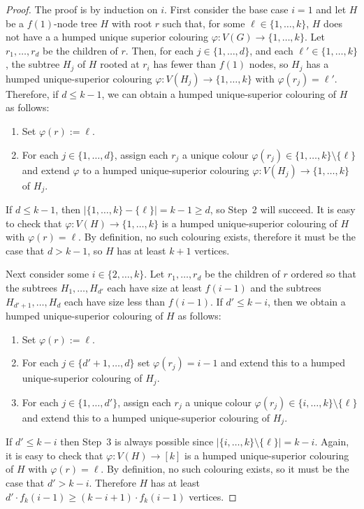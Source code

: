 \documentclass[kpfonts]{patmorin}
\begin{document}
\begin{proof}
    The proof is by induction on $i$. First consider the base case $i=1$ and let $H$ be a $f(1)$-node tree $H$ with root $r$ such that, for some $\ell\in\{1,\ldots,k\}$, $H$ does not have a a humped unique superior colouring $\varphi:V(G)\to \{1,\ldots,k\}$.  Let $r_1,\ldots,r_d$ be the children of $r$.
    Then, for each $j\in\{1,\ldots,d\}$, and each $\ell'\in \{1,\ldots,k\}$, the subtree $H_j$ of $H$ rooted at $r_i$ has fewer than $f(1)$ nodes, so $H_j$ has a humped unique-superior colouring $\varphi:V(H_j)\to \{1,\ldots,k\}$ with $\varphi(r_j)=\ell'$.  Therefore, if $d \le k-1$, we can obtain a humped unique-superior colouring of $H$ as follows:
    \begin{enumerate}
        \item Set $\varphi(r):=\ell$.
        \item For each $j\in\{1,\ldots,d\}$, assign each $r_j$ a unique colour  $\varphi(r_j)\in\{1,\ldots,k\}\setminus\{\ell\}$ and extend $\varphi$ to a humped unique-superior colouring $\varphi:V(H_j)\to\{1,\ldots,k\}$ of $H_j$.
    \end{enumerate}
    If $d\le k-1$, then $|\{1,\ldots,k\}-\{\ell\}|=k-1\ge d$, so Step~2 will succeed.
    It is easy to check that $\varphi:V(H)\to\{1,\ldots,k\}$ is a humped unique-superior colouring of $H$ with $\varphi(r)=\ell$.  By definition, no such colouring exists, therefore it must be the case that $d> k-1$, so $H$ has at least $k+1$ vertices.

    Next consider some $i\in\{2,\ldots,k\}$.  Let $r_1,\ldots,r_d$ be the children of $r$ ordered so that the subtrees $H_1,\ldots,H_{d'}$ each have size at least $f(i-1)$ and the subtrees $H_{d'+1},\ldots,H_d$ each have size less than $f(i-1)$.  If $d'\le k-i$, then we obtain a humped unique-superior colouring of $H$ as follows:
    \begin{enumerate}
        \item Set $\varphi(r):=\ell$.
        \item For each $j\in\{d'+1,\ldots,d\}$ set $\varphi(r_j)=i-1$ and extend this to a humped unique-superior colouring of $H_j$.
        \item For each $j\in\{1,\ldots,d'\}$, assign each $r_j$ a unique colour $\varphi(r_j)\in\{i,\ldots,k\}\setminus\{\ell\}$ and extend this to a humped unique-superior colouring of $H_j$.
    \end{enumerate}
    If $d'\le k-i$ then Step~3 is always possible since $|\{i,\ldots,k\}\setminus\{\ell\}|=k-i$. Again, it is easy to check that $\varphi:V(H)\to[k]$ is a humped unique-superior colouring of $H$ with $\varphi(r)=\ell$.  By definition, no such colouring exists, so it must be the case that $d'>k-i$. Therefore $H$ has at least $d'\cdot f_k(i-1)\ge (k-i+1)\cdot f_k(i-1)$ vertices.
\end{proof}
\end{document}
